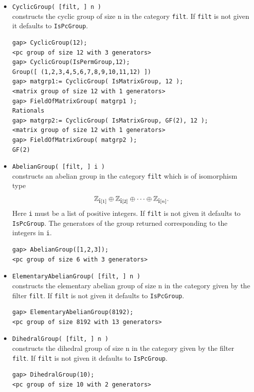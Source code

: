 \begin{itemize}
\item {\tt CyclicGroup( [filt, ] n )}\\[2pt] 
constructs the cyclic group of size n in the category {\tt filt}. 
If {\tt filt} is not given it defaults to {\tt IsPcGroup}.
{\codesize
\begin{verbatim}
gap> CyclicGroup(12);
<pc group of size 12 with 3 generators>
gap> CyclicGroup(IsPermGroup,12);
Group([ (1,2,3,4,5,6,7,8,9,10,11,12) ])
gap> matgrp1:= CyclicGroup( IsMatrixGroup, 12 );
<matrix group of size 12 with 1 generators>
gap> FieldOfMatrixGroup( matgrp1 );
Rationals
gap> matgrp2:= CyclicGroup( IsMatrixGroup, GF(2), 12 );
<matrix group of size 12 with 1 generators>
gap> FieldOfMatrixGroup( matgrp2 );
GF(2)
\end{verbatim}}
\item {\tt AbelianGroup( [filt, ] i )}\\[2pt] 
constructs an abelian group in the category {\tt filt} which is
of isomorphism type 
\[
\mathbb{Z}_{\mbox{i}[1]} \oplus \mathbb{Z}_{\mbox{i}[2]} \oplus \cdots \oplus \mathbb{Z}_{\mbox{i}[n]}.
\]
Here {\tt i} must be a list of positive integers. If {\tt filt} is not given it
defaults to {\tt IsPcGroup}. 
The generators of the group returned corresponding to the integers in {\tt i}.  %
{\codesize
\begin{verbatim}
gap> AbelianGroup([1,2,3]);
<pc group of size 6 with 3 generators>
\end{verbatim}}
\item {\tt ElementaryAbelianGroup( [filt, ] n )}\\[2pt] 
constructs the elementary abelian group of size n in the category given by the filter
{\tt filt}. If {\tt filt} is not given it defaults to {\tt IsPcGroup}.
{\codesize
\begin{verbatim}
gap> ElementaryAbelianGroup(8192);
<pc group of size 8192 with 13 generators>
\end{verbatim}}
\item {\tt DihedralGroup( [filt, ] n )}\\[2pt] 
constructs the dihedral group of size n in the category given by the filter
{\tt filt}. If {\tt filt} is not given it defaults to {\tt IsPcGroup}.
{\codesize
\begin{verbatim}
gap> DihedralGroup(10);
<pc group of size 10 with 2 generators>
\end{verbatim}}

\end{itemize}
